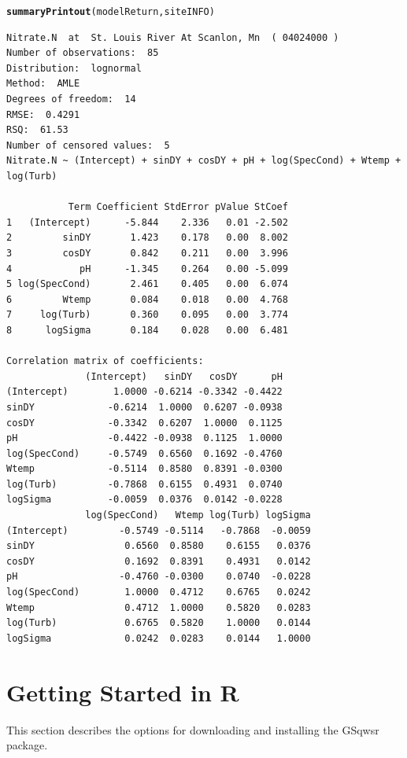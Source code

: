 \documentclass[a4paper,11pt]{article}\usepackage[]{graphicx}\usepackage[]{color}
\makeatletter
\newcommand{\hlstd}[1]{\textcolor[rgb]{0.345,0.345,0.345}{#1}}%
\newcommand{\hlkwd}[1]{\textcolor[rgb]{0.737,0.353,0.396}{\textbf{#1}}}%
\newenvironment{kframe}{%
 \def\at@end@of@kframe{}%
 \ifinner\ifhmode%
  \def\at@end@of@kframe{\end{minipage}}%
  \begin{minipage}{\columnwidth}%
 \fi\fi%
 \def\FrameCommand##1{\hskip\@totalleftmargin \hskip-\fboxsep
 \colorbox{shadecolor}{##1}\hskip-\fboxsep
     \hskip-\linewidth \hskip-\@totalleftmargin \hskip\columnwidth}%
 \MakeFramed {\advance\hsize-\width
   \@totalleftmargin\z@ \linewidth\hsize
   \@setminipage}}%
 {\par\unskip\endMakeFramed%
 \at@end@of@kframe}
\newenvironment{knitrout}{}{} %
\makeatother
\begin{document}
\begin{knitrout}
\color{fgcolor}\begin{kframe}
\begin{alltt}
\hlkwd{summaryPrintout}\hlstd{(modelReturn, siteINFO)}
\end{alltt}
\begin{verbatim}
Nitrate.N  at  St. Louis River At Scanlon, Mn  ( 04024000 )
Number of observations:  85 
Distribution:  lognormal 
Method:  AMLE 
Degrees of freedom:  14 
RMSE:  0.4291 
RSQ:  61.53 
Number of censored values:  5 
Nitrate.N ~ (Intercept) + sinDY + cosDY + pH + log(SpecCond) + Wtemp + log(Turb) 

           Term Coefficient StdError pValue StCoef
1   (Intercept)      -5.844    2.336   0.01 -2.502
2         sinDY       1.423    0.178   0.00  8.002
3         cosDY       0.842    0.211   0.00  3.996
4            pH      -1.345    0.264   0.00 -5.099
5 log(SpecCond)       2.461    0.405   0.00  6.074
6         Wtemp       0.084    0.018   0.00  4.768
7     log(Turb)       0.360    0.095   0.00  3.774
8      logSigma       0.184    0.028   0.00  6.481

Correlation matrix of coefficients: 
              (Intercept)   sinDY   cosDY      pH
(Intercept)        1.0000 -0.6214 -0.3342 -0.4422
sinDY             -0.6214  1.0000  0.6207 -0.0938
cosDY             -0.3342  0.6207  1.0000  0.1125
pH                -0.4422 -0.0938  0.1125  1.0000
log(SpecCond)     -0.5749  0.6560  0.1692 -0.4760
Wtemp             -0.5114  0.8580  0.8391 -0.0300
log(Turb)         -0.7868  0.6155  0.4931  0.0740
logSigma          -0.0059  0.0376  0.0142 -0.0228
              log(SpecCond)   Wtemp log(Turb) logSigma
(Intercept)         -0.5749 -0.5114   -0.7868  -0.0059
sinDY                0.6560  0.8580    0.6155   0.0376
cosDY                0.1692  0.8391    0.4931   0.0142
pH                  -0.4760 -0.0300    0.0740  -0.0228
log(SpecCond)        1.0000  0.4712    0.6765   0.0242
Wtemp                0.4712  1.0000    0.5820   0.0283
log(Turb)            0.6765  0.5820    1.0000   0.0144
logSigma             0.0242  0.0283    0.0144   1.0000
\end{verbatim}
\end{kframe}
\end{knitrout}

\clearpage
\appendix

\section{Getting Started in R}
\label{sec:appendix1}
This section describes the options for downloading and installing the GSqwsr package.
\end{document}
